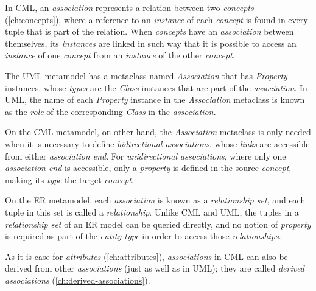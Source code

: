 In CML,
an \emph{association} represents a relation between two \emph{concepts} (\ref{ch:concepts}),
where a reference to an \emph{instance} of each \emph{concept} is found in every tuple that is part of the relation.
When \emph{concepts} have an \emph{association} between themselves,
its \emph{instances} are linked in such way that
it is possible to access an \emph{instance} of one \emph{concept}
from an \emph{instance} of the other \emph{concept}.

The UML \cite{uml} metamodel has a metaclass named \emph{Association} that has \emph{Property} instances,
whose \emph{types} are the \emph{Class} instances that are part of the \emph{association}.
In UML, the name of each \emph{Property} instance in the \emph{Association} metaclass
is known as the \emph{role} of the corresponding \emph{Class} in the \emph{association}.

On the CML metamodel, on other hand,
the \emph{Association} metaclass is only needed
when it is necessary to define \emph{bidirectional associations},
whose \emph{links} are accessible from either \emph{association end}.
For \emph{unidirectional associations},
where only one \emph{association end}  is accessible,
only a \emph{property} is defined in the source \emph{concept},
making its \emph{type} the target \emph{concept}.

On the ER \cite{er} metamodel,
each \emph{association} is known as a \emph{relationship set},
and each tuple in this set is called a \emph{relationship}.
Unlike CML and UML,
the tuples in a \emph{relationship set} of an ER model
can be queried directly,
and no notion of \emph{property} is required as part of the \emph{entity type}
in order to access those \emph{relationships}.

As it is case for \emph{attributes} (\ref{ch:attributes}),
\emph{associations} in CML can also be derived from other \emph{associations}
(just as well as in UML);
they are called \emph{derived associations} (\ref{ch:derived-associations}).
